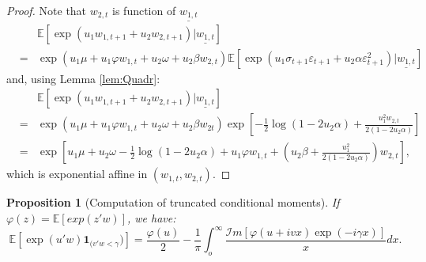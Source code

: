 \documentclass[
  12pt,
]{book}
\newtheorem{proposition}{Proposition}[chapter]
\theoremstyle{definition}
\theoremstyle{definition}
\theoremstyle{definition}
\theoremstyle{definition}
\theoremstyle{remark}
\begin{document}
\begin{proof}
Note that \(w_{2,t}\) is function of \(\underline{w_{1,t}}\)
\begin{eqnarray*}
&& \mathbb{E}[\exp(u_1 w_{1, t+1} + u_2 w_{2, t+1})|\underline{w_{1,t}}] \\
&= & \exp(u_1 \mu + u_1 \varphi w_{1,t} + u_2 \omega + u_2 \beta w_{2,t})  \mathbb{E}[\exp(u_1 \sigma_{t+1} \varepsilon_{t+1} + u_2 \alpha \varepsilon^2_{t+1})|\underline{w_{1,t}}]
\end{eqnarray*}
and, using Lemma \ref{lem:Quadr}:
\begin{eqnarray*}
&&\mathbb{E}[\exp(u_1 w_{1, t+1} + u_2 w_{2, t+1})|\underline{w_{1,t}}] \\
&= & \exp(u_1 \mu + u_1 \varphi w_{1,t} + u_2 \omega + u_2 \beta w_{2t})  \exp \left[ -   \frac{1}{2}   \log(1-2 u_2 \alpha) +
\frac{u^2_1 w_{2,t}}{2(1-2 u_2 \alpha)} \right]\\
&= & \exp \left[ u_1 \mu + u_2 \omega -  \frac{1}{2}   \log(1-2u_2\alpha)+  u_1 \varphi w_{1,t} + \left(u_2 \beta +  \frac{u^2_1}{2(1-2u_2\alpha)}\right)
w_{2,t}\right],
\end{eqnarray*}
which is exponential affine in \((w_{1,t}, w_{2,t})\).
\end{proof}

\begin{proposition}[Computation of truncated conditional moments]
\protect\hypertarget{prp:Fourier}{}\label{prp:Fourier}If \(\varphi(z)=\mathbb{E}[exp(z'w)]\), we have:
\begin{equation}
\mathbb{E}[\exp(u'w)\textbf{1}_{(v'w<\gamma})] = \frac{\varphi(u)}{2} -  \frac{1}{\pi} \int^\infty_o
\frac{{\mathcal I}m[\varphi(u+ivx)\exp(-i\gamma x)]}{x}dx.\label{eq:Truncated}
\end{equation}
\end{proposition}
\end{document}
